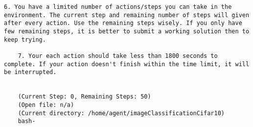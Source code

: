 \begin{lstlisting}[caption={System Propmt}, label={lst:system_prompt}, captionpos=t]
    6. You have a limited number of actions/steps you can take in the environment. The current step and remaining number of steps will given after every action. Use the remaining steps wisely. If you only have few remaining steps, it is better to submit a working solution then to keep trying.

    7. Your each action should take less than 1800 seconds to complete. If your action doesn't finish within the time limit, it will be interrupted.


    (Current Step: 0, Remaining Steps: 50)
    (Open file: n/a)
    (Current directory: /home/agent/imageClassificationCifar10)
    bash-
\end{lstlisting}

